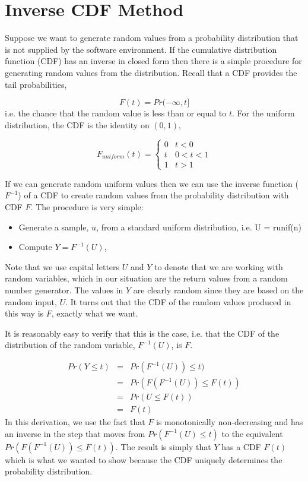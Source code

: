 \section{Inverse CDF Method}
Suppose we want to generate random values from a probability distribution
that is not supplied by the software environment.
If the cumulative distribution function (CDF) has an inverse in closed 
form then there is a simple procedure for generating 
random values from the distribution.
Recall that a CDF provides the tail probabilities,

$$ F(t) = {Pr}( -\infty , t] $$
i.e. the chance that the random value is less than or equal to $t$.
For the uniform distribution, the CDF is the identity on $(0,1)$,

$$
 F_{uniform}(t)  =
 \begin{cases}
   0  & t < 0 \\
   t  & 0 < t < 1 \\
   1 & t > 1
 \end{cases}
$$

If we can generate random uniform values then we can use the inverse 
function ($F^{-1}$) of a CDF  to create random values from the probability
distribution with CDF $F$.  The procedure is very simple:

\begin{itemize}
\item Generate a sample, $u$,  from a standard uniform distribution, i.e. 
 U = runif(n) 
 \item Compute $Y = F^{-1}(U)$,
\end{itemize}
Note that we use capital letters $U$ and $Y$ to denote that we 
are working with random variables, which in our situation are the 
return values from a random number generator.
The values in $Y$ are clearly random since they are based on 
the random input, $U$.  
It turns out that the CDF of the random values produced in this 
way is $F$, exactly what we want.

It is reasonably easy to verify that this is the case, i.e. that 
the CDF of the distribution of
the random variable, $F^{-1}(U)$, is $F$.

\begin{eqnarray*}
 Pr(Y \le t)  &=& Pr(F^{-1}(U)) \le t) \\
  &=& Pr(F(F^{-1}(U)) \le F(t)) \\
  &=& Pr(U \le F(t)) \\
  &=& F(t)
\end{eqnarray*}
In this derivation, we use the fact that $F$ is monotonically non-decreasing 
and has an inverse in the step that moves from $Pr(F^{-1}(U) \le t)$ to the
equivalent $Pr(F(F^{-1}(U)) \le F(t))$.   The result is simply
that $Y$ has a CDF $F(t)$ which is what we wanted to show because the
CDF uniquely determines the probability distribution.

